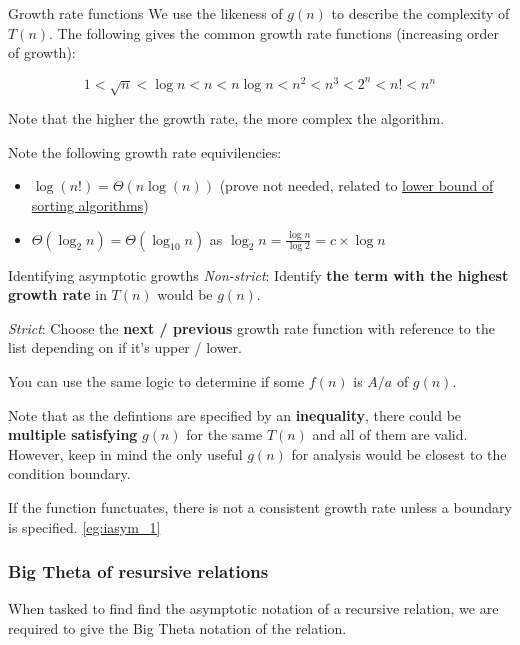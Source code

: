 \begin{knBox}
    {Growth rate functions}
    We use the likeness of $g(n)$ to describe the complexity of $T(n)$. The following gives the common growth rate functions (increasing order of growth):

    \[
        1 < \sqrt{n} < \log n < n < n\log n < n^2 < n^3 < 2^n < n! < n^n
    \]

    Note that the higher the growth rate, the more complex the algorithm.

    Note the following growth rate equivilencies:
    \begin{itemize}
        \item $\log(n!)=\Theta(n\log(n))$ (prove not needed, related to \hyperref[thm:lower_bound_sort]{lower bound of sorting algorithms})
        \item $\Theta(\log_2n)=\Theta(\log_{10}n)$ as $\log_2n = \frac{\log n}{\log 2} = c\times\log n$
    \end{itemize}
\end{knBox}

\begin{theorem}
    {Identifying asymptotic growths}
    \textit{Non-strict}: Identify \textbf{the term with the highest growth rate} in $T(n)$ would be $g(n)$.

    \textit{Strict}: Choose the \textbf{next / previous} growth rate function with reference to the list depending on if it's upper / lower.

    You can use the same logic to determine if some $f(n)$ is $A/a$ of $g(n)$.

    Note that as the defintions are specified by an \textbf{inequality}, there could be \textbf{multiple satisfying} $g(n)$ for the same $T(n)$ and all of them are valid. However, keep in mind the only useful $g(n)$ for analysis would be closest to the condition boundary.

    If the function functuates, there is not a consistent growth rate unless a boundary is specified.
    \tcblower
    \label{thm:iasym}
    \ref{eg:iasym_1}
\end{theorem}

\subsubsection{Big Theta of resursive relations}

When tasked to find find the asymptotic notation of a recursive relation, we are required to give the Big Theta notation of the relation.


